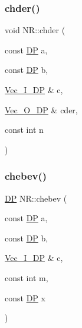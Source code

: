 \subsubsection{\texorpdfstring{chder()}{chder()}}
{\footnotesize\ttfamily void N\+R\+::chder (\begin{DoxyParamCaption}\item[{const \mbox{\hyperlink{namespaceNR_af6ff762dd605ff477b8e52387253a02a}{DP}}}]{a,  }\item[{const \mbox{\hyperlink{namespaceNR_af6ff762dd605ff477b8e52387253a02a}{DP}}}]{b,  }\item[{\mbox{\hyperlink{namespaceNR_a9f943da53862537c552e2a770cb170ae}{Vec\+\_\+\+I\+\_\+\+DP}} \&}]{c,  }\item[{\mbox{\hyperlink{namespaceNR_a970094d23441f8ef6a45282a7eb2103d}{Vec\+\_\+\+O\+\_\+\+DP}} \&}]{cder,  }\item[{const int}]{n }\end{DoxyParamCaption})}

\mbox{\label{namespaceNR_a824086662aa6006a7bf1d3954ae84e43}} 
\subsubsection{\texorpdfstring{chebev()}{chebev()}}
{\footnotesize\ttfamily \mbox{\hyperlink{namespaceNR_af6ff762dd605ff477b8e52387253a02a}{DP}} N\+R\+::chebev (\begin{DoxyParamCaption}\item[{const \mbox{\hyperlink{namespaceNR_af6ff762dd605ff477b8e52387253a02a}{DP}}}]{a,  }\item[{const \mbox{\hyperlink{namespaceNR_af6ff762dd605ff477b8e52387253a02a}{DP}}}]{b,  }\item[{\mbox{\hyperlink{namespaceNR_a9f943da53862537c552e2a770cb170ae}{Vec\+\_\+\+I\+\_\+\+DP}} \&}]{c,  }\item[{const int}]{m,  }\item[{const \mbox{\hyperlink{namespaceNR_af6ff762dd605ff477b8e52387253a02a}{DP}}}]{x }\end{DoxyParamCaption})}

\mbox{\label{namespaceNR_a66f115e76c9feef59cfc3ef4a534acc5}} 
